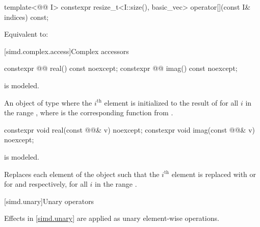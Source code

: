 \begin{itemdecl}
template<@@ I>
  constexpr resize_t<I::size(), basic_vec> operator[](const I& indices) const;
\end{itemdecl}

\begin{itemdescr}
\pnum
\effects
Equivalent to: 
\end{itemdescr}

[simd.complex.access]{Complex accessors}

\begin{itemdecl}
constexpr @@ real() const noexcept;
constexpr @@ imag() const noexcept;
\end{itemdecl}

\begin{itemdescr}
\pnum
\constraints
{} is modeled.

\pnum
\returns
An object of type 
where the $i^\text{th}$ element is initialized to the result of
 for all $i$ in the range
, where  is the corresponding function
from .
\end{itemdescr}

\begin{itemdecl}
constexpr void real(const @@& v) noexcept;
constexpr void imag(const @@& v) noexcept;
\end{itemdecl}

\begin{itemdescr}
\pnum
\constraints
{} is modeled.

\pnum
\effects
Replaces each element of the  object such that the
$i^\text{th}$ element is replaced with  or 
for  and  respectively, for all $i$ in the range .
\end{itemdescr}

[simd.unary]{Unary operators}

\pnum
Effects in \ref{simd.unary} are applied as unary element-wise operations.


